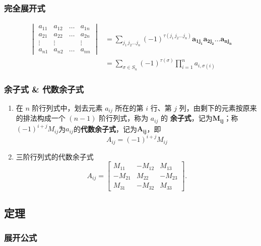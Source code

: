 \documentclass[a4paper,12pt]{article}
\begin{document}
    \subsubsection{完全展开式}

    \begin{align*}
        \begin{vmatrix}
            a_{11} & a_{12} & \dots & a_{1n} \\
            a_{21} & a_{22} & \dots & a_{2n} \\
            \vdots & \vdots &       & \vdots \\
            a_{n1} & a_{n2} & \dots & a_{nn}
        \end{vmatrix}
        &= \sum_{j_1\,j_2\dots j_{n}} (-1)^{\tau(j_1\,j_2\dots j_n)} \mathbf{a_{1j_1}a_{2j_2}\dots a_{nj_n}} \\
        &= \sum_{\sigma \in S_n} (-1)^{\tau(\sigma)} \prod_{i=1}^{n} a_{i, \sigma(i)}
    \end{align*}

    \subsubsection{余子式 \& 代数余子式}

    \begin{enumerate}
        \item 在 $n$ 阶行列式中，划去元素 $a_{ij}$ 所在的第 $i$ 行、第 $j$ 列，由剩下的元素按原来的排法构成一个 $(n-1)$ 阶行列式，称为 $a_{ij}$ 的 \textbf{余子式}，记为$\mathbf{M_{ij}}$；称$(-1)^{i+j}M_{ij}$为$a_{ij}$的\textbf{代数余子式}，记为$\mathbf{A_{ij}}$，即
        \[
            A_{ij} = (-1)^{i+j}M_{ij}
        \]
        \item 三阶行列式的代数余子式
        \[
            A_{ij} =
            \begin{bmatrix}
                M_{11}  & -M_{12} & M_{13}  \\
                -M_{21} & M_{22}  & -M_{23} \\
                M_{31}  & -M_{32} & M_{33}
            \end{bmatrix}.
        \]
    \end{enumerate}

    \subsection{定理}

    \subsubsection{展开公式}
\end{document}
